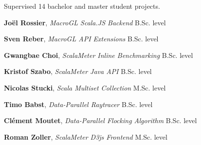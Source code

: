\documentclass[9pt]{article}
\begin{document}
\bigskip




\medskip
{}

\noindent
Supervised 14 bachelor and master student projects.
\newline

\noindent
{\bf Joël Rossier},
{\em MacroGL Scala.JS Backend}
\newline\noindent B.Sc. level
\medskip

\noindent
{\bf Sven Reber},
{\em MacroGL API Extensions}
\newline\noindent B.Sc. level
\medskip

\noindent
{\bf Gwangbae Choi},
{\em ScalaMeter Inline Benchmarking}
\newline\noindent B.Sc. level
\medskip

\noindent
{\bf Kristof Szabo},
{\em ScalaMeter Java API}
\newline\noindent B.Sc. level
\medskip

\noindent
{\bf Nicolas Stucki},
{\em Scala Multiset Collection}
\newline\noindent M.Sc. level
\medskip

\noindent
{\bf Timo Babst},
{\em Data-Parallel Raytracer}
\newline\noindent B.Sc. level
\medskip

\noindent
{\bf Clément Moutet},
{\em Data-Parallel Flocking Algorithm}
\newline\noindent B.Sc. level
\medskip

\noindent
{\bf Roman Zoller},
{\em ScalaMeter D3js Frontend}
\newline\noindent M.Sc. level
\medskip
\end{document}
